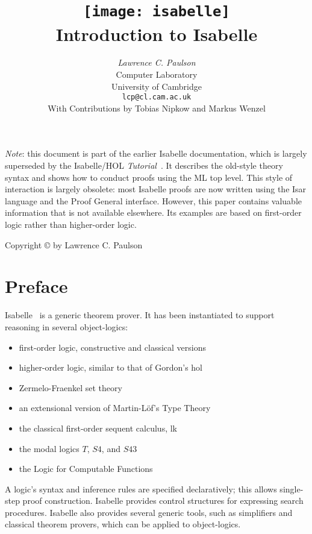 \documentclass[12pt,a4paper]{article}
\title{\texttt{[image: isabelle]} \\[4ex] Introduction to Isabelle}
\author{{\em Lawrence C. Paulson}\\
        Computer Laboratory \\ University of Cambridge \\
        \texttt{lcp@cl.cam.ac.uk}\\[3ex] 
        With Contributions by Tobias Nipkow and Markus Wenzel
}
\begin{document}
\pagestyle{empty}
\begin{titlepage}
\maketitle 
\emph{Note}: this document is part of the earlier Isabelle documentation, 
which is largely superseded by the Isabelle/HOL
\emph{Tutorial}~\cite{isa-tutorial}. It describes the old-style theory 
syntax and shows how to conduct proofs using the 
ML top level. This style of interaction is largely obsolete:
most Isabelle proofs are now written using the Isar 
language and the Proof General interface. However, this paper contains valuable 
information that is not available elsewhere. Its examples are based 
on first-order logic rather than higher-order logic.

\thispagestyle{empty}
\vfill
{\small Copyright \copyright{} \number\year{} by Lawrence C. Paulson}
\end{titlepage}

\pagestyle{headings}
\part*{Preface}
 
Isabelle~\cite{paulson-natural,paulson-found,paulson700} is a generic theorem
prover.  It has been instantiated to support reasoning in several
object-logics:
\begin{itemize}
\item first-order logic, constructive and classical versions
\item higher-order logic, similar to that of Gordon's {\sc
hol}~\cite{mgordon-hol}
\item Zermelo-Fraenkel set theory~\cite{suppes72}
\item an extensional version of Martin-L\"of's Type Theory~\cite{nordstrom90}
\item the classical first-order sequent calculus, {\sc lk}
\item the modal logics $T$, $S4$, and $S43$
\item the Logic for Computable Functions~\cite{paulson87}
\end{itemize}
A logic's syntax and inference rules are specified declaratively; this
allows single-step proof construction.  Isabelle provides control
structures for expressing search procedures.  Isabelle also provides
several generic tools, such as simplifiers and classical theorem provers,
which can be applied to object-logics.
\end{document}
